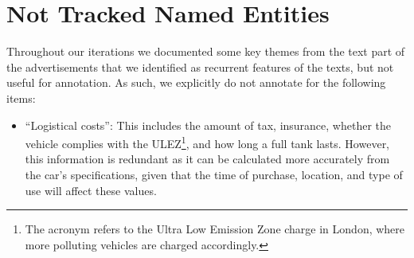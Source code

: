 \documentclass[11pt]{article}
\begin{document}


\section{Not Tracked Named Entities}
\label{sec:appendix:not_tracked}

Throughout our iterations we documented some key themes from the text part of the advertisements that we identified as recurrent features of the texts, but not useful for annotation. As such, we explicitly do not annotate for the following items:

\begin{itemize}
    \item ``Logistical costs'': This includes the amount of tax, insurance, whether the vehicle complies with the ULEZ\footnote{The acronym refers to the Ultra Low Emission Zone charge in London, where more polluting vehicles are charged accordingly.}, and how long a full tank lasts. However, this information is redundant as it can be calculated more accurately from the car's specifications, given that the time of purchase, location, and type of use will affect these values.


\end{itemize}
\end{document}
